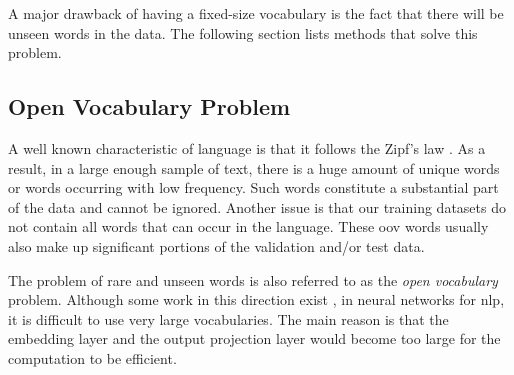 A major drawback of having a fixed-size vocabulary is the fact that there will
be unseen words in the data. The following section lists methods that solve
this problem.



\subsection{Open Vocabulary Problem}

A well known characteristic of language is that it follows the Zipf's law
\citep{zipf1949human}. As a result, in a large enough sample of text, there is
a huge amount of unique words or words occurring with low frequency. Such words
constitute a substantial part of the data and cannot be ignored.  Another issue
is that our training datasets do not contain all words that can occur in the
language. These \gls{oov} words usually also make up significant portions of
the validation and/or test data.

The problem of rare and unseen words is also referred to as the \emph{open
vocabulary} problem. Although some work in this direction exist
\citep{jean2015using}, in neural networks for \gls{nlp}, it is difficult to use
very large vocabularies. The main reason is that the embedding layer and the
output projection layer would become too large for the computation to be
efficient.

